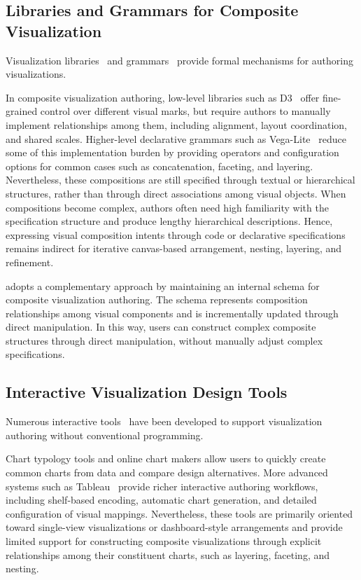 \subsection{Libraries and Grammars for Composite Visualization}

Visualization libraries~\cite{Protovis, Atlas, Encodable, ProtoGraph, bostock2011d3} and grammars~\cite{nebula, Atlas, Decinteraction, satyanarayan2015reactive, satyanarayan2016vega, zong2022animated, VolumeVisualization, moreira2023urban, ATOM, Gosling, dmutidens, Libra} provide formal mechanisms for authoring visualizations. 

In composite visualization authoring, low-level libraries such as D3~\cite{bostock2011d3} offer fine-grained control over different visual marks, but require authors to manually implement relationships among them, including alignment, layout coordination, and shared scales. Higher-level declarative grammars such as Vega-Lite~\cite{satyanarayan2016vega} reduce some of this implementation burden by providing operators and configuration options for common cases such as concatenation, faceting, and layering. Nevertheless, these compositions are still specified through textual or hierarchical structures, rather than through direct associations among visual objects. When compositions become complex, authors often need high familiarity with the specification structure and produce lengthy hierarchical descriptions. Hence, expressing visual composition intents through code or declarative specifications remains indirect for iterative canvas-based arrangement, nesting, layering, and refinement.

{\system} adopts a complementary approach by maintaining an internal schema for composite visualization authoring. The schema represents composition relationships among visual components and is incrementally updated through direct manipulation. In this way, users can construct complex composite structures through direct manipulation, without manually adjust complex specifications.

\subsection{Interactive Visualization Design Tools}

Numerous interactive tools~\cite{Epigraphics, DataInk, Tableau, Datawrapper,
plotly, Lyra, DataIllustrator} have been developed to support visualization
authoring without conventional programming.

Chart typology tools and online chart makers \cite{ManyEyes, Datawrapper,
RAWGraphs, plotly} allow users to quickly create common charts from
data and compare design alternatives. More advanced systems such as
Tableau~\cite{Tableau} provide richer interactive authoring workflows,
including shelf-based encoding, automatic chart generation, and detailed
configuration of visual mappings. Nevertheless, these tools are primarily
oriented toward single-view visualizations or dashboard-style arrangements
and provide limited support for constructing composite visualizations through
explicit relationships among their constituent charts, such as layering,
faceting, and nesting.

